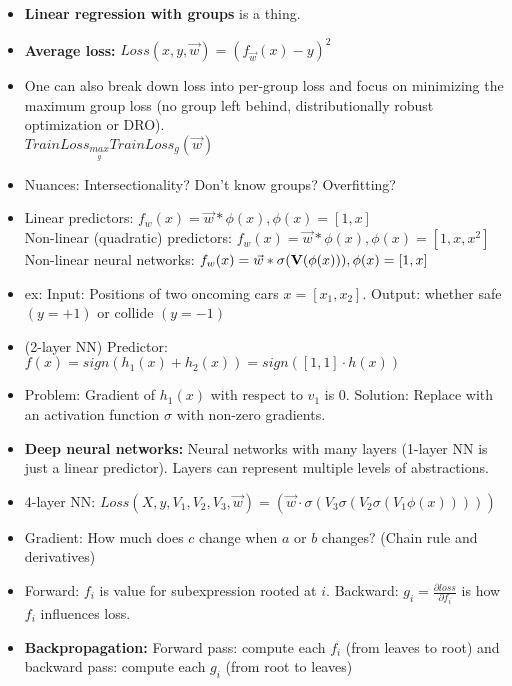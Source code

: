 \documentclass[10pt, oneside]{article}
\begin{document}
\begin{itemize}

\item \textbf{Linear regression with groups} is a thing.

\item \textbf{Average loss:} $Loss(x, y, \vec{w}) = (f_{\vec{w}} (x) - y)^2$

\item One can also break down loss into per-group loss and focus on minimizing the maximum group loss (no group left behind, distributionally robust optimization or DRO).\\
$TrainLoss_{\underset{g}{max}}TrainLoss_g(\vec{w})$

\item Nuances: Intersectionality? Don't know groups? Overfitting?

\item Linear predictors: $f_w(x) = \vec{w} * \phi(x), \phi(x) = [1, x]$\\
Non-linear (quadratic) predictors: $f_w(x) = \vec{w} * \phi(x), \phi(x) = [1, x, x^2]$\\
Non-linear neural networks: $f_w(x) = \vec{w} * \sigma({\bf V}(\phi(x))), \phi(x) = [1, x]$\\
\item ex: Input: Positions of two oncoming cars $x = [x_1, x_2]$. Output: whether safe $(y = +1)$ or collide $(y = -1)$

\item (2-layer NN) Predictor: $f(x) = sign(h_1(x) + h_2(x)) = sign([1,1]\cdot h(x))$

\item Problem: Gradient of $h_1(x)$ with respect to $v_1$ is 0. Solution: Replace with an activation function $\sigma$ with non-zero gradients.

\item \textbf{Deep neural networks: } Neural networks with many layers (1-layer NN is just a linear predictor). Layers can represent multiple levels of abstractions.

\item 4-layer NN: $Loss(X, y, V_1, V_2, V_3, \vec{w}) = (\vec{w} \cdot \sigma(V_3\sigma(V_2\sigma(V_1\phi(x)))))$

\item Gradient: How much does $c$ change when $a$ or $b$ changes? (Chain rule and derivatives)

\item Forward: $f_i$ is value for subexpression rooted at $i$. Backward: $g_i = \frac{\partial loss}{\partial f_i}$ is how $f_i$ influences loss.
\item {\bf Backpropagation:} Forward pass: compute each $f_i$ (from leaves to root) and backward pass: compute each $g_i$ (from root to leaves)
\end{itemize}
\end{document}

